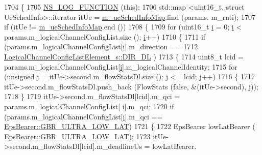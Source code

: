 \begin{DoxyCode}
1704 \{
1705         \hyperlink{log-macros-disabled_8h_a90b90d5bad1f39cb1b64923ea94c0761}{NS\_LOG\_FUNCTION} (\textcolor{keyword}{this});
1706   std::map <uint16\_t, struct UeSchedInfo>::iterator itUe = \hyperlink{classns3_1_1MmWaveFlexTtiMaxRateMacScheduler_ac8359b3799f29f5b49e0f2dd52acd0ab}{m\_ueSchedInfoMap}.find (params.
      m\_rnti);
1707   \textcolor{keywordflow}{if} (itUe != \hyperlink{classns3_1_1MmWaveFlexTtiMaxRateMacScheduler_ac8359b3799f29f5b49e0f2dd52acd0ab}{m\_ueSchedInfoMap}.end ())
1708   \{
1709         \textcolor{keywordflow}{for} (uint16\_t \hyperlink{bernuolliDistribution_8m_a6f6ccfcf58b31cb6412107d9d5281426}{i} = 0; \hyperlink{bernuolliDistribution_8m_a6f6ccfcf58b31cb6412107d9d5281426}{i} < params.m\_logicalChannelConfigList.size (); \hyperlink{bernuolliDistribution_8m_a6f6ccfcf58b31cb6412107d9d5281426}{i}++)
1710         \{
1711                 \textcolor{keywordflow}{if} (params.m\_logicalChannelConfigList[\hyperlink{bernuolliDistribution_8m_a6f6ccfcf58b31cb6412107d9d5281426}{i}].m\_direction ==
1712                                 \hyperlink{structns3_1_1LogicalChannelConfigListElement__s_a0ce1e3a6af4d9a3e9fc19361d0af4e00a31e389072f64c3e83e1da04be05ada0f}{LogicalChannelConfigListElement\_s::DIR\_DL}
      )
1713                 \{
1714                 uint8\_t lcid = params.m\_logicalChannelConfigList[\hyperlink{bernuolliDistribution_8m_a6f6ccfcf58b31cb6412107d9d5281426}{i}].m\_logicalChannelIdentity;
1715                 \textcolor{keywordflow}{for} (\textcolor{keywordtype}{unsigned} j = itUe->second.m\_flowStatsDl.size (); j <= lcid; j++)
1716                 \{
1717                         itUe->second.m\_flowStatsDl.push\_back (FlowStats (\textcolor{keyword}{false}, &(itUe->second), j));
1718                 \}
1719                         itUe->second.m\_flowStatsDl[lcid].m\_qci = params.m\_logicalChannelConfigList[
      \hyperlink{bernuolliDistribution_8m_a6f6ccfcf58b31cb6412107d9d5281426}{i}].m\_qci;
1720                         \textcolor{keywordflow}{if} (params.m\_logicalChannelConfigList[\hyperlink{bernuolliDistribution_8m_a6f6ccfcf58b31cb6412107d9d5281426}{i}].m\_qci == 
      \hyperlink{structns3_1_1EpsBearer_aecf0c67109c5eb4ec0b07226fff5885ea1b3267491c7ea82ddc90b433c429c7c1}{EpsBearer::GBR\_ULTRA\_LOW\_LAT})
1721                         \{
1722                                 EpsBearer lowLatBearer (
      \hyperlink{structns3_1_1EpsBearer_aecf0c67109c5eb4ec0b07226fff5885ea1b3267491c7ea82ddc90b433c429c7c1}{EpsBearer::GBR\_ULTRA\_LOW\_LAT});
1723                                 itUe->second.m\_flowStatsDl[lcid].m\_deadlineUs = lowLatBearer.

\end{DoxyCode}
